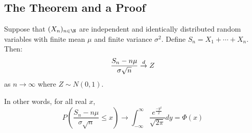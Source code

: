 \documentclass[../Main.tex]{subfiles}
\begin{document}
\subsection{The Theorem and a Proof}
\begin{theorem}
    Suppose that $(X_n)_{n \in \N}$ are independent and identically distributed random variables with finite mean $\mu$ and finite variance $\sigma^2$. Define $S_n = X_1 + \cdots + X_n$. Then:
    \begin{equation*}
        \frac{S_n - n\mu}{\sigma\sqrt{n}} \overset{d}{\rightarrow} Z
    \end{equation*}
    as $n \to \infty$ where $Z \sim N(0, 1)$.

    In other words, for all real $x$,
    \begin{equation*}
        P\left(\frac{S_n - n\mu}{\sigma\sqrt{n}}\leq x\right) \to \int_{-\infty}^\infty \frac{e^\frac{-y^2}{2}}{\sqrt{2\pi}} dy = \Phi(x)
    \end{equation*}
    \label{thmCentralLimit}
\end{theorem}
\end{document}
